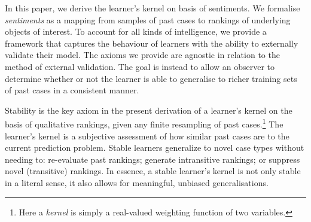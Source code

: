 \documentclass[12pt,a4paper,twoside]{article}
\newcommand{\gsii}{$\textup{GS03}$}
\begin{document}
  In this paper, we derive the learner's kernel on basis of {sentiments}.  We
  formalise \emph{sentiments} as a mapping from samples of past cases to
  rankings of underlying objects of interest.  To account for all kinds of
  intelligence, we provide a framework that captures the behaviour of learners
  with the ability to externally validate their model. The axioms we provide
  are agnostic in relation to the method of external validation. The goal is
  instead to allow an observer to determine whether or not the learner is able
  to generalise to richer training sets of past cases in a consistent manner.
  
  Stability is the key axiom in the present derivation of a learner's kernel on
  the basis of qualitative rankings, given any finite resampling of past
  cases.\footnote{Here a \emph{kernel} is simply a real-valued weighting
  function of two variables.} The learner's kernel is a subjective assessment
  of how similar past cases are to the current prediction problem.  Stable
  learners generalize to novel case types without needing to: re-evaluate past
  rankings; generate intransitive rankings; or suppress novel (transitive)
  rankings. In essence, a stable learner's kernel is not only stable in a
  literal sense, it also allows for meaningful, unbiased generalisations.
 

\end{document}
